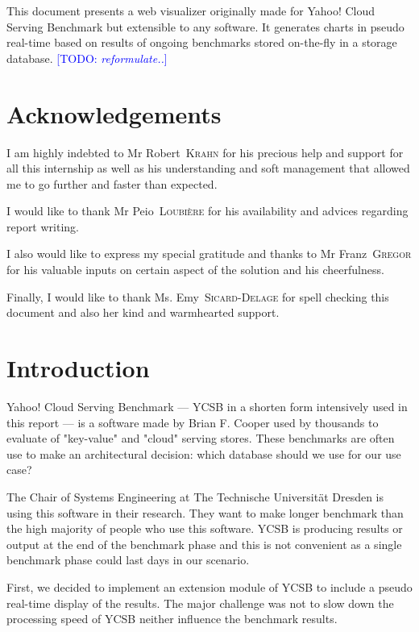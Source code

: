 \documentclass[a4paper,11pt]{report}
\newcommand*{\auteur}[2]{\large #1~\textsc{#2}} %
\newcommand*{\todo}[1]{\textcolor{blue}{[TODO: \emph{#1}]}}
\begin{document}
This document presents a web visualizer originally made for Yahoo! Cloud Serving Benchmark but extensible to any software. It generates charts in pseudo real-time based on results of ongoing benchmarks stored on-the-fly in a storage database. \todo{reformulate..}

\tableofcontents

\newpage

\listoffigures  %

\newpage
\chapter*{Acknowledgements}

I am highly indebted to Mr \auteur{Robert}{Krahn} for his precious help and support for all this internship as well as his understanding and soft management that allowed me to go further and faster than expected.

I would like to thank Mr \auteur{Peio}{Loubière} for his availability and advices regarding report writing.

I also would like to express my special gratitude and thanks to Mr \auteur{Franz}{Gregor} for his valuable inputs on certain aspect of the solution and his cheerfulness.

Finally, I would like to thank Ms. \auteur{Emy}{Sicard-Delage} for spell checking this document and also her kind and warmhearted support.

\chapter*{Introduction}

Yahoo! Cloud Serving Benchmark --- YCSB in a shorten form intensively used in this report --- is a software made by Brian F. Cooper \cite{ycsb:repo} used by thousands to evaluate of "key-value" and "cloud" serving stores. These benchmarks are often use to make an architectural decision: which database should we use for our use case?

The Chair of Systems Engineering at The Technische Universität Dresden is using this software in their research. They want to make longer benchmark than the high majority of people who use this software. YCSB is producing results or output at the end of the benchmark phase and this is not convenient as a single benchmark phase could last days in our scenario.

First, we decided to implement an extension module of YCSB to include a pseudo real-time display of the results. The major challenge was not to slow down the processing speed of YCSB neither influence the benchmark results. 
\end{document}
